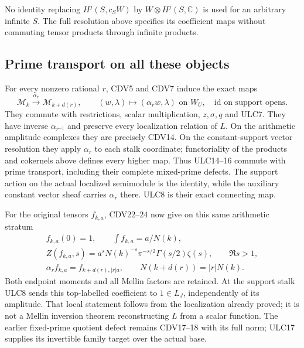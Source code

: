 \documentclass[11pt,a4paper]{article}
\theoremstyle{definition}\newtheorem{definition}[theorem]{Definition}
\begin{document}
No identity replacing $H^j(S,c_SW)$ by
$W\otimes H^j(S,\mathbb C)$ is used for an arbitrary infinite
$S$. The full resolution above specifies its coefficient maps
without commuting tensor products through infinite products.

\subsection{Prime transport on all these objects}
For every nonzero rational $r$, CDV5 and CDV7 induce the exact maps
\begin{equation}\tag{ULC17}
 \mathcal M_k\xrightarrow{\alpha_r}\mathcal M_{k+d(r)},\qquad
 (w,\lambda)\mapsto(\alpha_rw,\lambda)\text{ on }W_U,
 \quad\mathrm{id}\text{ on support opens}.
\end{equation}
They commute with restrictions, scalar multiplication, $z,\sigma,q$
and ULC7. They have inverse $\alpha_{r^{-1}}$ and preserve every
localization relation of $L$. On the arithmetic amplitude complexes
they are precisely CDV14. On the constant-support vector resolution
they apply $\alpha_r$ to each stalk coordinate; functoriality of
the products and cokernels above defines every higher map. Thus
ULC14--16 commute with prime transport, including their complete
mixed-prime defects. The support action on the actual localized
semimodule is the identity, while the auxiliary constant vector
sheaf carries $\alpha_r$ there. ULC8 is their exact connecting map.

For the original tensors $f_{k,a}$, CDV22--24 now give on this
same arithmetic stratum
\begin{equation}\tag{ULC18}
 \begin{gathered}
 f_{k,a}(0)=1,\qquad\int f_{k,a}=a/N(k),\\
 Z(f_{k,a},s)=a^sN(k)^{-s}\pi^{-s/2}\Gamma(s/2)\zeta(s),
 \qquad\Re s>1,\\
 \alpha_rf_{k,a}=f_{k+d(r),|r|a},\qquad
 N(k+d(r))=|r|N(k).
 \end{gathered}
\end{equation}
Both endpoint moments and all Mellin factors are retained. At the
support stalk ULC8 sends this top-labelled coefficient to $1\in L_J$,
independently of its amplitude. That local statement follows from
the localization already proved; it is not a Mellin inversion
theorem reconstructing $L$ from a scalar function. The earlier
fixed-prime quotient defect remains CDV17--18 with its full norm;
ULC17 supplies its invertible family target over the actual base.
\end{document}
